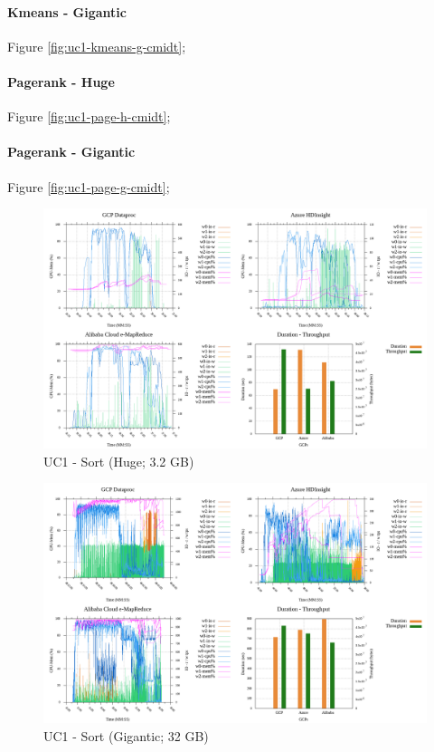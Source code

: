 \documentclass[review]{elsarticle}
\begin{document}
\paragraph{Kmeans - Gigantic} Figure \ref{fig:uc1-kmeans-g-cmidt};

\paragraph{Pagerank - Huge} Figure \ref{fig:uc1-page-h-cmidt};

\paragraph{Pagerank - Gigantic} Figure \ref{fig:uc1-page-g-cmidt};


\begin{figure}[b]
	\includegraphics[width=\textwidth]{uc1-srt-h-cmidt}
	\caption{UC1 - Sort (Huge; 3.2 GB)}
	\label{fig:uc1-srt-h-cmidt}
	\centering
\end{figure}

\begin{figure}[b]
	\includegraphics[width=\textwidth]{uc1-srt-g-cmidt}
	\caption{UC1 - Sort (Gigantic; 32 GB)}
	\label{fig:uc1-srt-g-cmidt}
	\centering
\end{figure}
\end{document}
